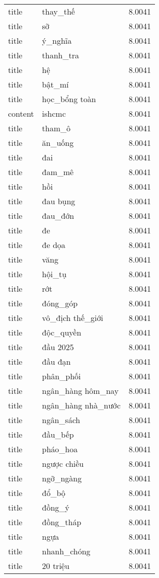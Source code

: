 \documentclass{article}
\begin{document}
\begin{tabular}{lll}
title & thay\_thế & 8.0041\\
title & sỡ & 8.0041\\
title & ý\_nghĩa & 8.0041\\
title & thanh\_tra & 8.0041\\
title & hệ & 8.0041\\
title & bật\_mí & 8.0041\\
title & học\_bổng toàn & 8.0041\\
content & ishcmc & 8.0041\\
title & tham\_ô & 8.0041\\
title & ăn\_uống & 8.0041\\
title & đai & 8.0041\\
title & đam\_mê & 8.0041\\
title & hồi & 8.0041\\
title & đau bụng & 8.0041\\
title & đau\_đớn & 8.0041\\
title & đe & 8.0041\\
title & đe dọa & 8.0041\\
title & văng & 8.0041\\
title & hội\_tụ & 8.0041\\
title & rớt & 8.0041\\
title & đóng\_góp & 8.0041\\
title & vô\_địch thế\_giới & 8.0041\\
title & độc\_quyền & 8.0041\\
title & đầu 2025 & 8.0041\\
title & đầu đạn & 8.0041\\
title & phân\_phối & 8.0041\\
title & ngân\_hàng hôm\_nay & 8.0041\\
title & ngân\_hàng nhà\_nước & 8.0041\\
title & ngân\_sách & 8.0041\\
title & đầu\_bếp & 8.0041\\
title & pháo\_hoa & 8.0041\\
title & ngược chiều & 8.0041\\
title & ngỡ\_ngàng & 8.0041\\
title & đổ\_bộ & 8.0041\\
title & đồng\_ý & 8.0041\\
title & đồng\_tháp & 8.0041\\
title & ngựa & 8.0041\\
title & nhanh\_chóng & 8.0041\\
title & 20 triệu & 8.0041\\

\end{tabular}
\end{document}
